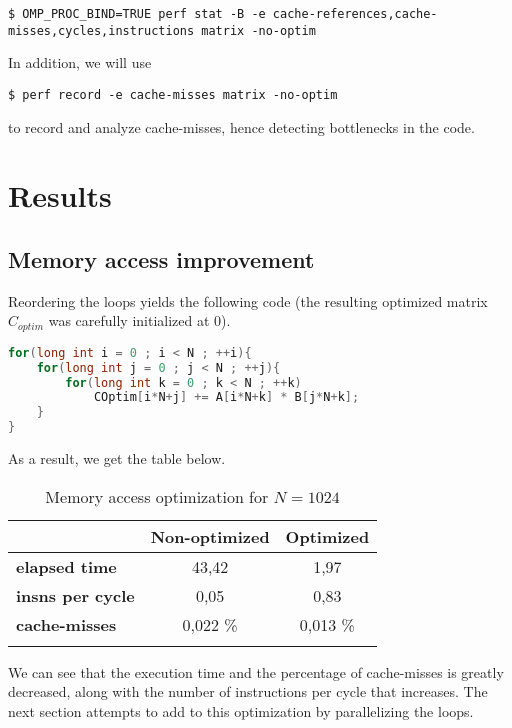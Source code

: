 \documentclass[a4paper, 10 pt, conference]{ieeeconf}
\newcommand{\tabhead}[1]{{\bfseries#1}}
\begin{document}
\begin{lstlisting}[breaklines]
    $ OMP_PROC_BIND=TRUE perf stat -B -e cache-references,cache-misses,cycles,instructions matrix -no-optim
\end{lstlisting}
In addition, we will use 
\begin{lstlisting}[breaklines]
    $ perf record -e cache-misses matrix -no-optim
\end{lstlisting}
to record and analyze cache-misses, hence detecting bottlenecks in the code. 


\section{\textbf{Results}}


\subsection{Memory access improvement}
Reordering the loops yields the following code (the resulting optimized matrix $C_{optim}$ was carefully initialized at $0$). 

\begin{lstlisting}[language=C++, caption={Memory access optimized code}]
for(long int i = 0 ; i < N ; ++i){
    for(long int j = 0 ; j < N ; ++j){
        for(long int k = 0 ; k < N ; ++k)
            COptim[i*N+j] += A[i*N+k] * B[j*N+k];
    }
}
\end{lstlisting}
As a result, we get the table below.
\begin{table}[h!]
    \centering
    \begin{tabular}{l c c}
        \toprule
         & \tabhead{Non-optimized} & \tabhead{Optimized} \\
        \midrule
        \tabhead{elapsed time} & 43,42 & 1,97 \\
        \tabhead{insns per cycle} & 0,05 & 0,83 \\
        \tabhead{cache-misses} & 0,022  \% & 0,013 \%\\
        \bottomrule\\
    \end{tabular}
    \caption{Memory access optimization for $N=1024$}
\end{table}
We can see that the execution time and the percentage of cache-misses is greatly decreased, along with the number of instructions per cycle that increases. The next section attempts to add to this optimization by parallelizing the loops.
\end{document}
